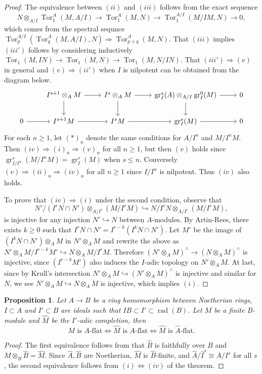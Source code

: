 \documentclass[leqno]{amsart}
\DeclareMathOperator{\gr}{gr}
\DeclareMathOperator{\rad}{rad}
\newcommand{\1}{\mathbf{1}}
\DeclareMathOperator{\Tor}{Tor}
\newtheorem{prop}[thm]{Proposition}
\theoremstyle{definition}
\theoremstyle{remark}
\begin{document}
\begin{proof}
	The equivalence between $(ii)$ and $(iii)$ follows from 
	the exact sequence
	\[
		N\otimes_{A/I}\Tor^A_1(M,A/I)\to 
		\Tor^A_1(M,N)\to 
		\Tor^{A/I}_1(M/IM,N)\to 0,
	\]
	which comes from the spectral sequnce  
	$\Tor^{A/I}_p(\Tor^A_q(M,A/I),N)\Longrightarrow\Tor_{p+q}^A(M,N)$.
	That $(iii)$ implies $(iii')$ follows by considering inductively
	$\Tor_1(M,IN)\to \Tor_1(M,N)\to \Tor_1(M,N/IN)$.
	That $(iii')\Longrightarrow(v)$ in general and 
	$(v)\Longrightarrow(ii')$ when $I$ is nilpotent 
	can be obtained from the diagram below.
	\[
		\begin{tikzcd}
			&I^{s+1}\otimes_AM\arrow[d]\arrow[r]
				&I^{s}\otimes_AM\arrow[d]\arrow[r]
					& \gr^s_I(A)\otimes_{A/I}
					\gr^0_I(M) \arrow[r]\arrow[d]
						&0\\
		0\arrow[r]
			&I^{s+1}M\arrow[r]
				&I^{s}M\arrow[r]
					&\gr^s_I(M)\arrow[r]
						&0
		\end{tikzcd}
	\]
	For each $n\geq1$, let  $(*)_n$ denote the same conditions
	for  $A/I^n$ and  $M/I^nM$.
	Then $(iv)\Longrightarrow(i)_n\Longrightarrow(v)_n$ for all  $n\geq 1$,
	but then $(v)$ holds since
	$\gr^s_{I/I^n}(M/I^nM)=\gr^s_I(M)$ when $s\leq n$.
	Conversely $(v)\Longrightarrow(ii)_n\Longrightarrow(iv)_n$
	for all $n\geq1$ since $I/I^n$ is nilpotent.
	Thus $(iv)$ also holds.

	To prove that $(iv)\Longrightarrow(i)$ under the second condition,
	observe that 
	\[
		 N'/(I^rN\cap N')\otimes_{A/I^r}(M/I^rM)\hookrightarrow
		 N/I^rN\otimes_{A/I^r}(M/I^rM),
	\]
	is injective for any injection 
	$N'\hookrightarrow N$ between $A$-modules. 
	By Artin-Rees, there exists $k\geq 0$
	such that  $I^rN\cap N'=I^{r-k}(I^kN\cap N')$.
	Let $M'$ be the image of  $(I^kN\cap N')\otimes_AM$
	in  $N'\otimes_AM$ and rewrite the above as
	$N'\otimes_AM/I^{r-k}M'\hookrightarrow N\otimes_AM/I^rM$.
	Therefore
	$(N'\otimes_AM)^\wedge\to(N\otimes_AM)^\wedge$ is injective,
	since $(I^{r-k}M')$ also induces 
	the $I$-adic topology on $N'\otimes_AM$.
	At last, since by Krull's intersection
	$N'\otimes_AM\hookrightarrow (N'\otimes_AM)^\wedge$
	is injective and similar for $N$,
	we see $N'\otimes_AM\hookrightarrow N\otimes_AM$
	is injective, which implies  $(i)$.
\end{proof}

\begin{prop}\label{prop:flat_completion}
	Let $A\to B$ be a ring homomorphism between Noetherian rings,
	$I\subset A$ and  $I'\subset B$
	are ideals such that $IB\subset I'\subset \rad(B)$.
	Let  $M$ be a finite  $B$-module and 
	$\hat{M}$ be the $I'$-adic completion, then
	\[
		M\text{ is }A\text{-flat}\Longleftrightarrow
		\hat{M}\text{ is }A\text{-flat}\Longleftrightarrow
		\hat{M}\text{ is }\hat{A}\text{-flat}.
	\]
\end{prop}
\begin{proof}
	The first equivalence follows from that 
	$\hat{B}$ is faithfully over $B$ and $M\otimes_B\hat{B}=\hat{M}$.
	Since $\hat{A}, \hat{B}$ are Noetherian,
	$\hat{M}$ is $\hat{B}$-finite,
	and $ \hat{A}/\hat{I}^s\cong A/I^s$ for all $s$,
	the second equivalence follows from 
	$(i)\Longleftrightarrow(iv)$ of the theorem.
\end{proof}
\end{document}
